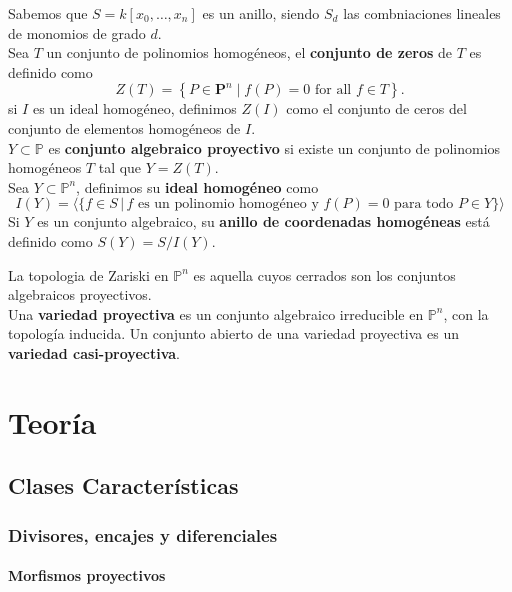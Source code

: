 \documentclass[12pt]{book}
\begin{document}
Sabemos que $S= k[x_0 , \ldots, x_n]$ es un anillo, siendo $S_d$ las combniaciones lineales de monomios de grado $d$.\\
Sea $T$ un conjunto de polinomios homogéneos, el \textbf{conjunto de zeros} de $T$ es definido como
$$
Z(T)=\left\{P \in \mathbf{P}^n \mid f(P)=0 \text { for all } f \in T\right\} .
$$
si $I$ es un ideal homogéneo, definimos $Z(I)$ como el conjunto de ceros del conjunto de elementos homogéneos de $I$.\\
$Y \subset \mathbb{P}$ es \textbf{conjunto algebraico proyectivo} si existe un conjunto de polinomios homogéneos $T$ tal que $Y= Z(T)$.\\
Sea $Y\subset \mathbb{P}^n$, definimos su \textbf{ideal homogéneo} como $$I(Y)= \langle \{ f\in S \, | \, f \mbox{ es un polinomio homogéneo y } f(P)=0 \mbox{ para todo } P \in Y \}  \rangle $$ 
Si $Y$ es un conjunto algebraico, su \textbf{anillo de coordenadas homogéneas} está definido como $S(Y)= S/I(Y)$.

La topologia de Zariski en $\mathbb{P}^n$ es aquella cuyos cerrados son los conjuntos algebraicos proyectivos.\\
Una \textbf{variedad proyectiva} es un conjunto algebraico irreducible en $\mathbb{P}^n$, con la topología inducida. Un conjunto abierto de una variedad proyectiva es un \textbf{variedad casi-proyectiva}.


















\part{Teoría}


\chapter{Clases Características}

\section{Divisores, encajes y diferenciales}

\subsection{Morfismos proyectivos}
\end{document}
